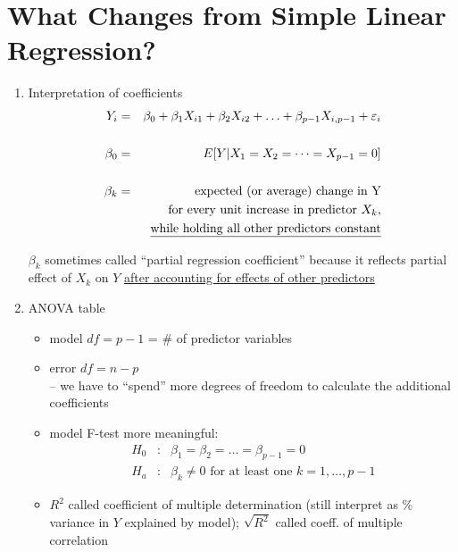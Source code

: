 \documentclass[12pt]{../notes}
\begin{document}
\section{What Changes from Simple Linear Regression?}
\begin{enumerate}
\item Interpretation of coefficients
\begin{eqnarray}
  Y_i & = & \beta_0 + \beta_1 X_{i1} + \beta_2 X_{i2} + \ldots + \beta_{p-1} X_{i,p-1} + \varepsilon_i \nonumber \\
   & & \nonumber \\
\beta_0 & = & E[Y | X_1=X_2=\cdots=X_{p-1}=0] \nonumber \\
& & \nonumber \\
\beta_k & = & \mbox{expected (or average) change in Y} \nonumber \\
  & & \mbox{for every unit increase in predictor $X_k$,}\nonumber\\
  & & \mbox{\underline{while holding all other predictors constant}}\nonumber
\end{eqnarray}

\begin{minipage}[l][1cm][c]{\textwidth}
\end{minipage}

$\beta_k$ sometimes called ``partial regression coefficient''
because it reflects partial effect of $X_k$ on $Y$ \underline{after
accounting for effects of other predictors}\\

\item ANOVA table
\begin{itemize}
  \item model $df = p-1$ = \# of predictor variables
  \item error $df = n-p$\\
        -- we have to ``spend'' more degrees of freedom to calculate the additional coefficients
  \item model F-test more meaningful:
        \begin{eqnarray}
          H_0 & : & \beta_1 = \beta_2 = \ldots = \beta_{p-1} = 0   \nonumber \\
          H_a & : & \beta_k \neq 0 \mbox{ for at least one } k=1,\ldots,p-1 \nonumber
        \end{eqnarray}
  \item $R^2$ called coefficient of multiple determination (still interpret as \% variance in $Y$ explained by model);
        $\sqrt{R^2}$ called coeff. of multiple correlation
\end{itemize}


\end{enumerate}
\end{document}
